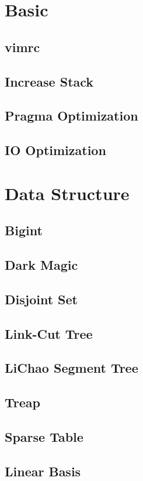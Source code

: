 \documentclass[a4paper,10pt,twocolumn,oneside]{article}
\begin{document}
\pagestyle{fancy}
\fancyfoot{}
\fancyhead[R]{\thepage}
\renewcommand{\headrulewidth}{0.4pt}
\renewcommand{\contentsname}{Contents} 

\scriptsize
\vspace{-2em}
\tableofcontents
\vspace{-1em}



\newcommand{\includecode}[2]{
  \subsection{#1}
  \vspace{-0.8em}
  
  \vspace{-1.2em}
}

\newcommand{\includetex}[2]{
  \subsection{#1}
  
  \vspace{-1.2em}
}

\newcommand{\sectiontitle}[1]{
  \section{#1}
  \vspace{-0.5em}
}



\sectiontitle{Basic}

\includecode{vimrc}{../codes/Basic/vimrc}
\includecode{Increase Stack}{../codes/Basic/IncStack.cpp}
\includecode{Pragma Optimization}{../codes/Basic/Pragma.cpp}
% 
% 
\includecode{IO Optimization}{../codes/Basic/IOOptimize.cpp}


\sectiontitle{Data Structure}

\includecode{Bigint}{../codes/Data_Structure/Bigint.cpp}
\includecode{Dark Magic}{../codes/Data_Structure/ext_pbds.cpp}
% 
\includecode{Disjoint Set}{../codes/Data_Structure/DisjointSet.cpp}
\includecode{Link-Cut Tree}{../codes/Data_Structure/LCT.cpp}
\includecode{LiChao Segment Tree}{../codes/Data_Structure/LiChao.cpp}
\includecode{Treap}{../codes/Data_Structure/Treap.cpp}
\includecode{Sparse Table}{../codes/Data_Structure/SparseTable.cpp}
\includecode{Linear Basis}{../codes/Data_Structure/LinearBasis.cpp}
\end{document}
